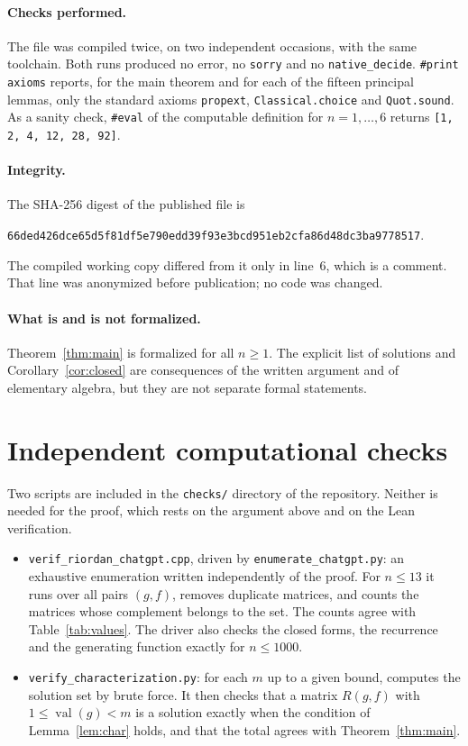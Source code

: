 \documentclass[11pt,a4paper]{amsart}
\theoremstyle{definition}
\theoremstyle{remark}
\newcommand{\val}{\operatorname{val}}
\begin{document}
\paragraph{Checks performed.} The file was compiled twice, on two independent occasions, with the same toolchain. Both runs produced no error, no \texttt{sorry} and no \texttt{native\_decide}. \texttt{\#print axioms} reports, for the main theorem and for each of the fifteen principal lemmas, only the standard axioms \texttt{propext}, \texttt{Classical.choice} and \texttt{Quot.sound}. As a sanity check, \texttt{\#eval} of the computable definition for $n=1,\dots,6$ returns \texttt{[1, 2, 4, 12, 28, 92]}.

\paragraph{Integrity.} The SHA-256 digest of the published file is
\begin{center}\small\texttt{66ded426dce65d5f81df5e790edd39f93e3bcd951eb2cfa86d48dc3ba9778517}.\end{center}
The compiled working copy differed from it only in line~6, which is a comment. That line was anonymized before publication; no code was changed.

\paragraph{What is and is not formalized.} Theorem~\ref{thm:main} is formalized for all $n\ge1$. The explicit list of solutions and Corollary~\ref{cor:closed} are consequences of the written argument and of elementary algebra, but they are not separate formal statements.

\section{Independent computational checks}\label{sec:checks}

Two scripts are included in the \texttt{checks/} directory of the repository. Neither is needed for the proof, which rests on the argument above and on the Lean verification.
\begin{itemize}[leftmargin=2em]
\item \texttt{verif\_riordan\_chatgpt.cpp}, driven by \texttt{enumerate\_chatgpt.py}: an exhaustive enumeration written independently of the proof. For $n\le 13$ it runs over all pairs $(g,f)$, removes duplicate matrices, and counts the matrices whose complement belongs to the set. The counts agree with Table~\ref{tab:values}. The driver also checks the closed forms, the recurrence and the generating function exactly for $n\le 1000$.
\item \texttt{verify\_characterization.py}: for each $m$ up to a given bound, computes the solution set by brute force. It then checks that a matrix $R(g,f)$ with $1\le\val(g)<m$ is a solution exactly when the condition of Lemma~\ref{lem:char} holds, and that the total agrees with Theorem~\ref{thm:main}.
\end{itemize}
\end{document}
